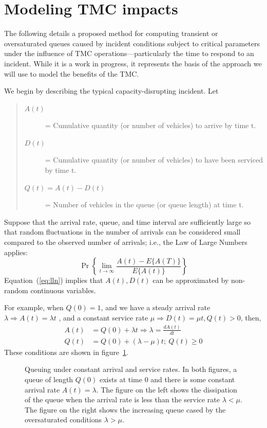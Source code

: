 \documentclass[12pt]{report}
\newcommand{\inputTikZ}[1]{%
  }
\newcommand{\inputTikZ}[1]{%
    \beginpgfgraphicnamed{#1-external}%
    \endpgfgraphicnamed%
  }
\begin{document}
\section{Modeling {TMC} impacts}
\label{sec:mod-tmc-impacts}

The following details a proposed method for computing transient or
oversaturated queues caused by incident conditions subject to critical
parameters under the influence of TMC operations---particularly the
time to respond to an incident. While it is a work in progress, it
represents the basis of the approach we will use to model the benefits
of the TMC.

We begin by describing the typical capacity-disrupting incident. Let
\begin{quote}
\begin{description}
\item[$A(t)$] = Cumulative quantity (or number of vehicles) to arrive
  by time t.
\item[$D(t)$] = Cumulative quantity (or number of vehicles) to have
  been serviced by time t.
\item[$Q(t)=A(t)-D(t)$] = Number of vehicles in the queue (or queue
  length) at time t.
\end{description}
\end{quote}
Suppose that the arrival rate, queue, and time interval are
sufficiently large so that random fluctuations in the number of
arrivals can be considered small compared to the observed number of
arrivals; i.e., the Law of Large Numbers applies:
\begin{equation}
  \label{eq:lln}
  \Pr\left\{\lim_{t\to\infty}\frac{A(t)-E\{A(T)\}}{E\{A(t)\}}\right\} 
\end{equation}
Equation~(\ref{eq:lln}) implies that $A(t), D(t)$ can be approximated by
non-random continuous variables.

For example, when $Q(0)=1$, and we have a steady arrival rate $\lambda
\Rightarrow A(t) = \lambda t$ , and a constant service rate $\mu \Rightarrow D(t)
= \mu t, Q(t)>0$, then, 
\begin{align*}
  \label{eq:arrival-and-queues}
  A(t) & = Q(0) + \lambda t \Rightarrow \lambda = \frac{dA(t)}{dt}\\
  Q(t) & = Q(0) + (\lambda - \mu ) t; \: Q(t) \ge 0
\end{align*}
These conditions are shown in figure~\ref{fig:queuing-constant-rates}.
\begin{figure}[tbp]
  \begin{center}
    \inputTikZ{figs/queuing-undersat-and-oversat}
    \caption[Queuing under constant arrival and service rates]{Queuing
      under constant arrival and service rates.  In both figures, a
      queue of length $Q(0)$ exists at time 0 and there is some
      constant arrival rate $A(t)=\lambda$.  The figure on the left
      shows the dissipation of the queue when the arrival rate is less
      than the service rate $\lambda<\mu$.  The figure on the right
      shows the increasing queue cased by the oversaturated conditions
      $\lambda>\mu$.}
    \label{fig:queuing-constant-rates}
  \end{center}
\end{figure}
 
\end{document}
